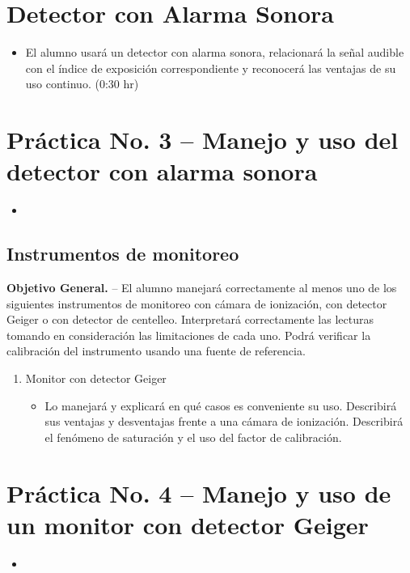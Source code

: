 \section{Detector con Alarma Sonora}
\begin{itemize}
  \item[(c)] El alumno usará un detector con alarma sonora, relacionará la señal audible con el índice de exposición correspondiente y reconocerá las ventajas de su uso continuo. (0:30 hr)
\end{itemize}

\section{Práctica No. 3 -- Manejo y uso del detector con alarma sonora}
\begin{itemize}
  \item[(1 hr)]
\end{itemize}

\subsection{Instrumentos de monitoreo}
\textbf{Objetivo General.} -- El alumno manejará correctamente al menos uno de los siguientes instrumentos de monitoreo con cámara de ionización, con detector Geiger o con detector de centelleo. Interpretará correctamente las lecturas tomando en consideración las limitaciones de cada uno. Podrá verificar la calibración del instrumento usando una fuente de referencia.

\begin{enumerate}
  \item Monitor con detector Geiger
    \begin{itemize}
      \item Lo manejará y explicará en qué casos es conveniente su uso. Describirá sus ventajas y desventajas frente a una cámara de ionización. Describirá el fenómeno de saturación y el uso del factor de calibración.
    \end{itemize}
\end{enumerate}

\section{Práctica No. 4 -- Manejo y uso de un monitor con detector Geiger}
\begin{itemize}
  \item[(1 hr)]
\end{itemize}

